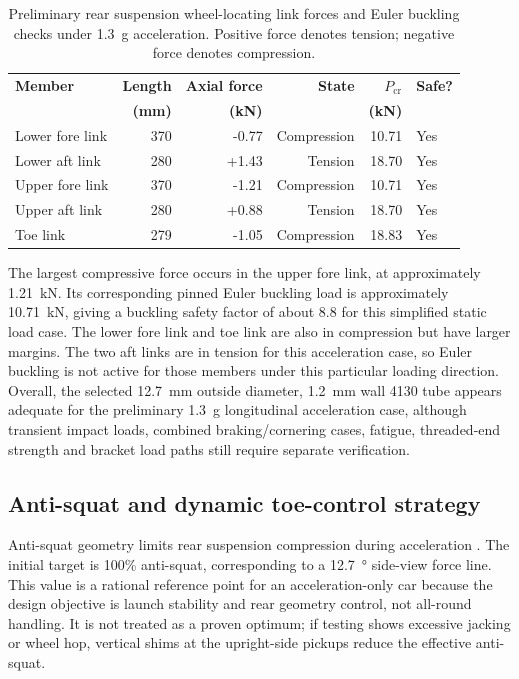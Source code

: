 \begin{table}[h!]
\centering
\caption{Preliminary rear suspension wheel-locating link forces and Euler buckling checks under \SI{1.3}{g} acceleration. Positive force denotes tension; negative force denotes compression.}
\label{tab:rear_link_force_buckling}
\begin{tabular}{lrrrrl}
\hline
\textbf{Member} &
\textbf{Length} &
\textbf{Axial force} &
\textbf{State} &
\textbf{\(P_{\mathrm{cr}}\)} &
\textbf{Safe?} \\
&
\textbf{(mm)} &
\textbf{(kN)} &
&
\textbf{(kN)} &
\\
\hline
Lower fore link & 370 & -0.77 & Compression & 10.71 & Yes \\
Lower aft link  & 280 & +1.43 & Tension     & 18.70 & Yes \\
Upper fore link & 370 & -1.21 & Compression & 10.71 & Yes \\
Upper aft link  & 280 & +0.88 & Tension     & 18.70 & Yes \\
Toe link        & 279 & -1.05 & Compression & 18.83 & Yes \\
\hline
\end{tabular}
\end{table}

The largest compressive force occurs in the upper fore link, at approximately \SI{1.21}{kN}. Its corresponding pinned Euler buckling load is approximately \SI{10.71}{kN}, giving a buckling safety factor of about 8.8 for this simplified static load case. The lower fore link and toe link are also in compression but have larger margins. The two aft links are in tension for this acceleration case, so Euler buckling is not active for those members under this particular loading direction. Overall, the selected \SI{12.7}{mm} outside diameter, \SI{1.2}{mm} wall 4130 tube appears adequate for the preliminary \SI{1.3}{g} longitudinal acceleration case, although transient impact loads, combined braking/cornering cases, fatigue, threaded-end strength and bracket load paths still require separate verification.

\subsection{Anti-squat and dynamic toe-control strategy}
\label{sec:antisquat_dynamic_toe}
Anti-squat geometry limits rear suspension compression during acceleration \parencite{zxSuspensionSecretsAntiSquat}. The initial target is 100\% anti-squat, corresponding to a \SI{12.7}{\degree} side-view force line. This value is a rational reference point for an acceleration-only car because the design objective is launch stability and rear geometry control, not all-round handling. It is not treated as a proven optimum; if testing shows excessive jacking or wheel hop, vertical shims at the upright-side pickups reduce the effective anti-squat.

